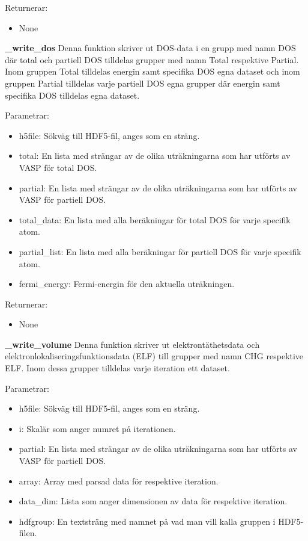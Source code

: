 \documentclass[10pt,oneside,swedish]{article}
\providecommand{\tightlist}{%
  \setlength{\itemsep}{0pt}\setlength{\parskip}{0pt}}
\begin{document}
Returnerar:

\begin{itemize}
\tightlist
\item
  None
\end{itemize}

\textbf{\_write\_dos} Denna funktion skriver ut DOS-data i en grupp med
namn DOS där total och partiell DOS tilldelas grupper med namn Total
respektive Partial. Inom gruppen Total tilldelas energin samt specifika
DOS egna dataset och inom gruppen Partial tilldelas varje partiell DOS
egna grupper där energin samt specifika DOS tilldelas egna dataset.

Parametrar:

\begin{itemize}
\tightlist
\item
  h5file: Sökväg till HDF5-fil, anges som en sträng.
\item
  total: En lista med strängar av de olika uträkningarna som har utförts
  av VASP för total DOS.
\item
  partial: En lista med strängar av de olika uträkningarna som har
  utförts av VASP för partiell DOS.
\item
  total\_data: En lista med alla beräkningar för total DOS för varje
  specifik atom.
\item
  partial\_list: En lista med alla beräkningar för partiell DOS för
  varje specifik atom.
\item
  fermi\_energy: Fermi-energin för den aktuella uträkningen.
\end{itemize}

Returnerar:

\begin{itemize}
\tightlist
\item
  None
\end{itemize}

\textbf{\_write\_volume} Denna funktion skriver ut elektrontäthetsdata
och elektronlokaliseringsfunktionsdata (ELF) till grupper med namn CHG
respektive ELF. Inom dessa grupper tilldelas varje iteration ett
dataset.

Parametrar:

\begin{itemize}
\tightlist
\item
  h5file: Sökväg till HDF5-fil, anges som en sträng.
\item
  i: Skalär som anger numret på iterationen.
\item
  partial: En lista med strängar av de olika uträkningarna som har
  utförts av VASP för partiell DOS.
\item
  array: Array med parsad data för respektive iteration.
\item
  data\_dim: Lista som anger dimensionen av data för respektive
  iteration.
\item
  hdfgroup: En textsträng med namnet på vad man vill kalla gruppen i
  HDF5-filen.
\end{itemize}
\end{document}
